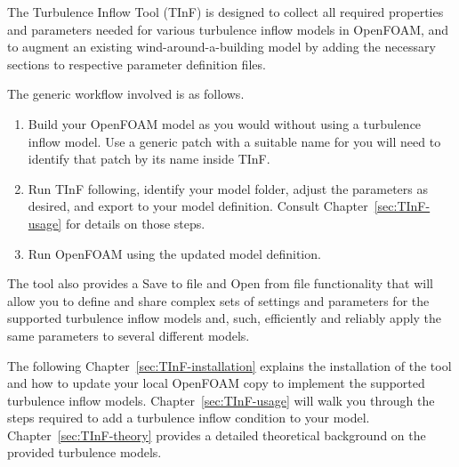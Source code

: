 
The Turbulence Inflow Tool (TInF) is designed to collect all required properties and parameters
needed for various turbulence inflow models in OpenFOAM, and to augment an existing wind-around-a-building model by adding the necessary sections to respective parameter definition files.

The generic workflow involved is as follows.
\begin{enumerate}
\item
   Build your OpenFOAM model as you would without using a turbulence inflow model.  Use a generic patch with a suitable name for you will need to identify that patch by its name inside TInF.
   
\item
   Run TInF following, identify your model folder, adjust the parameters as desired, and export to your model definition.
   Consult Chapter~\ref{sec:TInF-usage} for details on those steps.
   
\item
    Run OpenFOAM using the updated model definition.
    
\end{enumerate}

The tool also provides a Save to file and Open from file functionality that will allow you to
define and share complex sets of settings and parameters for the supported turbulence inflow models and, such, efficiently and reliably apply the same parameters to several different models.

\noindent
The following Chapter~\ref{sec:TInF-installation} explains the installation of the tool and how
to update your local OpenFOAM copy to implement the supported turbulence inflow models.
Chapter~\ref{sec:TInF-usage} will walk you through the steps required to add a turbulence inflow condition to your model.
Chapter~\ref{sec:TInF-theory} provides a detailed theoretical background on the provided turbulence models.
